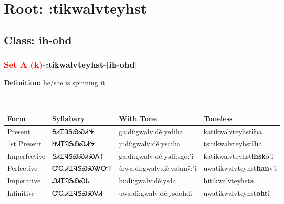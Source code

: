 \needspace{4in}
\section*{Root: :tikwalvteyhst}
\nopagebreak
{}
\needspace{3in}
\subsection*{Class: ih-ohd}
\nopagebreak
\needspace{2in}
\subsubsection*{\textcolor{Red}{Set A (k)}{-}\textbf{:tikwalvteyhst}{-}[ih-ohd]}
\nopagebreak
\textbf{Definition: } he/she is spinning it
\\[0.5em]
\begin{tabularx}{\textwidth}{l X X X}%
\toprule%
\textbf{Form}&\textbf{Syllabary}&\textbf{With Tone}&\textbf{Toneless}\\%
\midrule%
Present&ᎦᏗᏆᎸᏕᏯᏍᏗᎭ&ga:dí:gwalv:dě:ysdiha&katikwalvteyhst\textbf{ih}a\\%
1st Present&ᏥᏗᏆᎸᏕᏯᏍᏗᎭ&ji:dí:gwalv:dě:ysdiha&tsitikwalvteyhst\textbf{ih}a\\%
Imperfective&ᎦᏗᏆᎸᏕᏯᏍᏗᏍᎪᎢ&ga:dí:gwalv:dě:ysdi:sgó:’i&katikwalvteyhst\textbf{ihsk}o'i\\%
Perfective&ᎤᏩᏗᏆᎸᏕᏯᏍᏔᏅᎢ&ù:wa:dí:gwalv:dě:ystanv̌:’i&uwatikwalvteyhst\textbf{han}v'i\\%
Imperative&ᎯᏗᏆᎸᏕᏯᏍᏓ&hi:dì:gwalv:dě:ysda&hitikwalvteyhst\textbf{a}\\%
Infinitive&ᎤᏩᏗᏆᎸᏕᏯᏍᏙᏗ&uwa:dì:gwalv:dě:ysdohdi&uwatikwalvteyhst\textbf{oht}i\\%
\bottomrule%
\end{tabularx}
\\[1em]